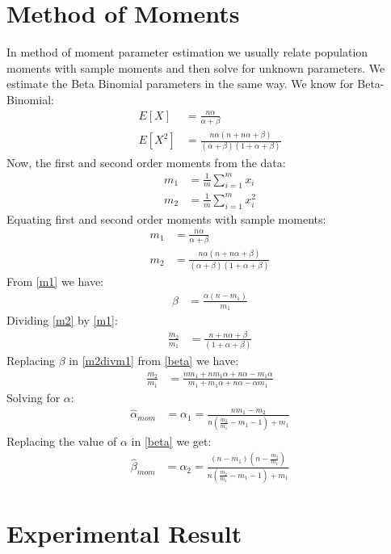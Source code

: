 \documentclass{article} %
\newcommand{\?}{\stackrel{?}{=}}
\begin{document}
\section{Method of Moments} \label{MOM}
In method of moment parameter estimation we usually relate population moments with sample moments and then solve for unknown parameters. We estimate the Beta Binomial parameters in the same way. We know for Beta-Binomial:
\begin{align}
E[X] &= \frac{n\alpha}{\alpha+\beta}\\
E[X^2] &= \frac{n\alpha(n+n\alpha+\beta)}{(\alpha+\beta)(1+\alpha+\beta)}
\end{align}
Now, the first and second order moments from the data:\\
\begin{align}
m_1&=\frac{1}{m}\sum\limits_{i=1}^{m}x_i\\
m_2&=\frac{1}{m}\sum\limits_{i=1}^{m}x_i^2
\end{align}
Equating first and second order moments with sample moments:
\begin{align}
m_1 &= \frac{n\alpha}{\alpha+\beta}\label{m1}\\
m_2 &= \frac{n\alpha(n+n\alpha+\beta)}{(\alpha+\beta)(1+\alpha+\beta)}\label{m2}
\end{align}
From \ref{m1} we have:
\begin{align}
\beta&=\frac{\alpha(n-m_1)}{m_1}\label{beta}
\end{align}
Dividing \ref{m2} by \ref{m1}:
\begin{align}
\frac{m_2}{m_1}&=\frac{n+n\alpha+\beta}{(1+\alpha+\beta)}\label{m2divm1}
\end{align}
Replacing $\beta$ in \ref{m2divm1} from \ref{beta} we have:
\begin{align}
\frac{m_2}{m_1}&=\frac{nm_1+nm_1\alpha+n\alpha-m_1\alpha}{m_1+m_1\alpha+n\alpha-\alpha m_1}\label{repBeta}
\end{align}
Solving for $\alpha$:
\begin{align}
\hat{\alpha}_{mom}&=\alpha_1 = \frac{nm_1-m_2}{n(\frac{m_2}{m_1}-m_1-1)+m_1}\label{MOM1}
\end{align}
Replacing the value of $\alpha$ in \ref{beta} we get:
\begin{align}
\hat{\beta}_{mom} &= \alpha_2 = \frac{(n-m_1)(n-\frac{m_2}{m_1})}{n(\frac{m_2}{m_1}-m_1-1)+m_1}\label{MOM2}
\end{align}

\section{Experimental Result}
\end{document}
